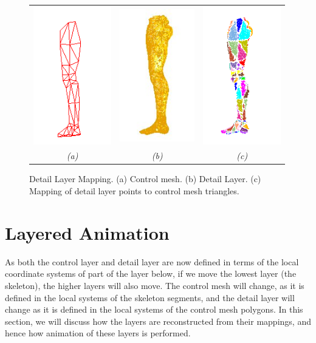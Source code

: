 \documentclass[10pt,oneside,fleqn,a4paper]{book}
\begin{document}
\begin{figure}
\begin{center}
\begin{tabular}{ccc}
\includegraphics[height=6cm]{../images/lowres_leg} &
\includegraphics[height=5.75cm]{../images/dense_leg_1} &
\includegraphics[height=6cm]{../images/leg_mapping} \\
{\it (a)} & {\it (b)} & {\it (c)}
\end{tabular}
\caption[Detail layer mapping]{\label{fig:detailmapping} Detail Layer Mapping. (a) Control mesh. (b) Detail Layer. (c) Mapping of detail layer points to control mesh triangles.}
\end{center}
\end{figure}

\section{\label{sec:chainanimation}Layered Animation}
As both the control layer and detail layer are now defined in terms of the local coordinate systems of part of the layer below, if we move the lowest layer (the skeleton), the higher layers will also move. The control mesh will change, as it is defined in the local systems of the skeleton segments, and the detail layer will change as it is defined in the local systems of the control mesh polygons. In this section, we will discuss how the layers are reconstructed from their mappings, and hence how animation of these layers is performed.
\end{document}
